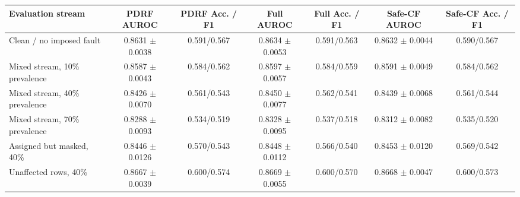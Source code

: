 \begin{tabular}{lcccccc}
\toprule
Evaluation stream & PDRF AUROC & PDRF Acc. / F1 & Full AUROC & Full Acc. / F1 & Safe-CF AUROC & Safe-CF Acc. / F1 \\
\midrule
Clean / no imposed fault & 0.8631 $\pm$ 0.0038 & 0.591/0.567 & 0.8634 $\pm$ 0.0053 & 0.591/0.563 & 0.8632 $\pm$ 0.0044 & 0.590/0.567 \\
Mixed stream, 10\% prevalence & 0.8587 $\pm$ 0.0043 & 0.584/0.562 & 0.8597 $\pm$ 0.0057 & 0.584/0.559 & 0.8591 $\pm$ 0.0049 & 0.584/0.562 \\
Mixed stream, 40\% prevalence & 0.8426 $\pm$ 0.0070 & 0.561/0.543 & 0.8450 $\pm$ 0.0077 & 0.562/0.541 & 0.8439 $\pm$ 0.0068 & 0.561/0.544 \\
Mixed stream, 70\% prevalence & 0.8288 $\pm$ 0.0093 & 0.534/0.519 & 0.8328 $\pm$ 0.0095 & 0.537/0.518 & 0.8312 $\pm$ 0.0082 & 0.535/0.520 \\
Assigned but masked, 40\% & 0.8446 $\pm$ 0.0126 & 0.570/0.543 & 0.8448 $\pm$ 0.0112 & 0.566/0.540 & 0.8453 $\pm$ 0.0120 & 0.569/0.542 \\
Unaffected rows, 40\% & 0.8667 $\pm$ 0.0039 & 0.600/0.574 & 0.8669 $\pm$ 0.0055 & 0.600/0.570 & 0.8668 $\pm$ 0.0047 & 0.600/0.573 \\
\bottomrule
\end{tabular}
